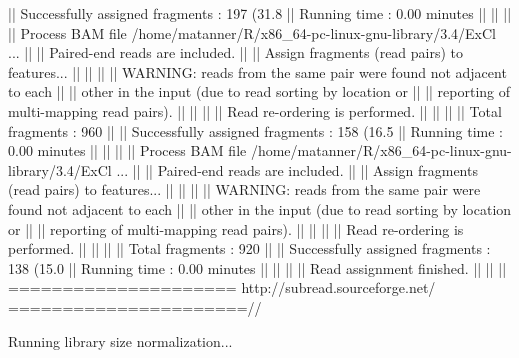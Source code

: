 \documentclass[12pt]{article}
\begin{document}
\begin{scriptsize}
\begin{Schunk}
\begin{Soutput}
||    Successfully assigned fragments : 197 (31.8%)                           ||
||    Running time : 0.00 minutes                                             ||
||                                                                            ||
|| Process BAM file /home/matanner/R/x86_64-pc-linux-gnu-library/3.4/ExCl ... ||
||    Paired-end reads are included.                                          ||
||    Assign fragments (read pairs) to features...                            ||
||                                                                            ||
||    WARNING: reads from the same pair were found not adjacent to each       ||
||             other in the input (due to read sorting by location or         ||
||             reporting of multi-mapping read pairs).                        ||
||                                                                            ||
||    Read re-ordering is performed.                                          ||
||                                                                            ||
||    Total fragments : 960                                                   ||
||    Successfully assigned fragments : 158 (16.5%)                           ||
||    Running time : 0.00 minutes                                             ||
||                                                                            ||
|| Process BAM file /home/matanner/R/x86_64-pc-linux-gnu-library/3.4/ExCl ... ||
||    Paired-end reads are included.                                          ||
||    Assign fragments (read pairs) to features...                            ||
||                                                                            ||
||    WARNING: reads from the same pair were found not adjacent to each       ||
||             other in the input (due to read sorting by location or         ||
||             reporting of multi-mapping read pairs).                        ||
||                                                                            ||
||    Read re-ordering is performed.                                          ||
||                                                                            ||
||    Total fragments : 920                                                   ||
||    Successfully assigned fragments : 138 (15.0%)                           ||
||    Running time : 0.00 minutes                                             ||
||                                                                            ||
||                         Read assignment finished.                          ||
||                                                                            ||
\\===================== http://subread.sourceforge.net/ ======================//


Running library size normalization...
\end{Soutput}
\end{Schunk}
\end{scriptsize}
\end{document}
